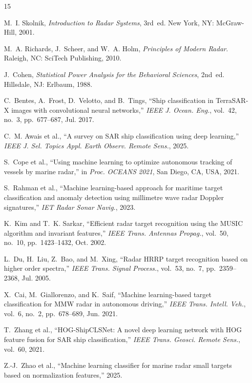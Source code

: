 \documentclass[journal]{IEEEtran}
\begin{document}

\begin{thebibliography}{15}

M.~I. Skolnik, \textit{Introduction to Radar Systems}, 3rd~ed. New York, NY: McGraw-Hill, 2001.

M.~A. Richards, J.~Scheer, and W.~A. Holm, \textit{Principles of Modern Radar}. Raleigh, NC: SciTech Publishing, 2010.

J.~Cohen, \textit{Statistical Power Analysis for the Behavioral Sciences}, 2nd~ed. Hillsdale, NJ: Erlbaum, 1988.

C.~Bentes, A.~Frost, D.~Velotto, and B.~Tings, ``Ship classification in TerraSAR-X images with convolutional neural networks,'' \textit{IEEE J. Ocean. Eng.}, vol.~42, no.~3, pp.~677--687, Jul. 2017.

C.~M. Awais et al., ``A survey on SAR ship classification using deep learning,'' \textit{IEEE J. Sel. Topics Appl. Earth Observ. Remote Sens.}, 2025.

S.~Cope et al., ``Using machine learning to optimize autonomous tracking of vessels by marine radar,'' in \textit{Proc. OCEANS 2021}, San Diego, CA, USA, 2021.

S.~Rahman et al., ``Machine learning-based approach for maritime target classification and anomaly detection using millimetre wave radar Doppler signatures,'' \textit{IET Radar Sonar Navig.}, 2023.

K.~Kim and T.~K. Sarkar, ``Efficient radar target recognition using the MUSIC algorithm and invariant features,'' \textit{IEEE Trans. Antennas Propag.}, vol.~50, no.~10, pp.~1423--1432, Oct. 2002.

L.~Du, H.~Liu, Z.~Bao, and M.~Xing, ``Radar HRRP target recognition based on higher order spectra,'' \textit{IEEE Trans. Signal Process.}, vol.~53, no.~7, pp.~2359--2368, Jul. 2005.

X.~Cai, M.~Giallorenzo, and K.~Saif, ``Machine learning-based target classification for MMW radar in autonomous driving,'' \textit{IEEE Trans. Intell. Veh.}, vol.~6, no.~2, pp.~678--689, Jun. 2021.

T.~Zhang et al., ``HOG-ShipCLSNet: A novel deep learning network with HOG feature fusion for SAR ship classification,'' \textit{IEEE Trans. Geosci. Remote Sens.}, vol.~60, 2021.

Z.-J.~Zhao et al., ``Machine learning classifier for marine radar small targets based on normalization features,'' 2025.

\end{thebibliography}
\end{document}
